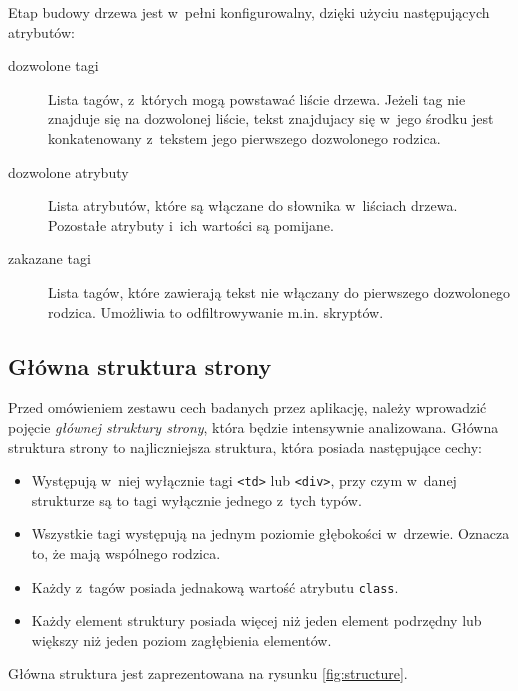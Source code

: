 \documentclass[a4paper,11pt]{article}
\begin{document}
Etap budowy drzewa jest w~pełni konfigurowalny, dzięki użyciu następujących atrybutów:

\begin{description}
    \item[dozwolone tagi] Lista tagów, z~których mogą powstawać liście drzewa. Jeżeli tag nie znajduje się na dozwolonej liście, tekst znajdujacy się w~jego środku jest konkatenowany z~tekstem jego pierwszego dozwolonego rodzica.
    \item[dozwolone atrybuty] Lista atrybutów, które są włączane do słownika w~liściach drzewa. Pozostałe atrybuty i~ich wartości są pomijane.
    \item[zakazane tagi] Lista tagów, które zawierają tekst nie włączany do pierwszego dozwolonego rodzica. Umożliwia to odfiltrowywanie m.in. skryptów.
\end{description}

\subsection{Główna struktura strony}
\label{sec:main_structure}

Przed omówieniem zestawu cech badanych przez aplikację, należy wprowadzić pojęcie \emph{głównej struktury strony}, która będzie intensywnie analizowana. Główna struktura strony to najliczniejsza struktura, która posiada następujące cechy:

\begin{itemize}
    \item Występują w~niej wyłącznie tagi \verb+<td>+ lub \verb+<div>+, przy czym w~danej strukturze są to tagi wyłącznie jednego z~tych typów.
    \item Wszystkie tagi występują na jednym poziomie głębokości w~drzewie. Oznacza to, że mają wspólnego rodzica.
    \item Każdy z~tagów posiada jednakową wartość atrybutu \verb+class+.
    \item Każdy element struktury posiada więcej niż jeden element podrzędny lub większy niż jeden poziom zagłębienia elementów.
\end{itemize}

Główna struktura jest zaprezentowana na rysunku \ref{fig:structure}.
\end{document}

